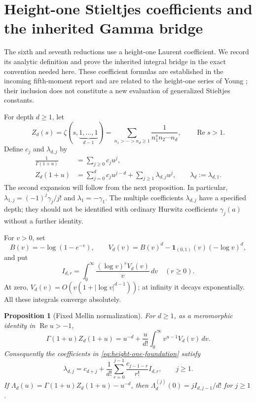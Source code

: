 \documentclass[11pt,a4paper]{article}
\numberwithin{equation}{section}
\theoremstyle{plain}
\newtheorem{proposition}[theorem]{Proposition}
\theoremstyle{definition}
\theoremstyle{remark}
\newcommand{\re}{\operatorname{Re}}
\begin{document}


\section{Height-one Stieltjes coefficients and the inherited Gamma bridge}
\label{sec:gamma-foundation}

The sixth and seventh reductions use a height-one Laurent coefficient.
We record its analytic definition and prove the inherited integral bridge
in the exact convention needed here. These coefficient formulas are
established in the incoming fifth-moment report and are related to the
height-one series of Young \cite{CanonicalFifth,Young2024}; their inclusion
does not constitute a new evaluation of generalized Stieltjes constants.

For depth $d\ge1$, let
\[
 Z_d(s)=\zeta(s,\underbrace{1,\ldots,1}_{d-1})
       =\sum_{n_1>\cdots>n_d\ge1}
          \frac{1}{n_1^s n_2\cdots n_d},\qquad \re s>1.
\]
Define $c_j$ and $\lambda_{d,j}$ by
\begin{align}
 \frac1{\Gamma(1+u)}&=\sum_{j\ge0}c_ju^j,\label{eq:gamma-c-foundation}\\
 Z_d(1+u)&=\sum_{j=0}^d c_ju^{j-d}
                    +\sum_{j\ge1}\lambda_{d,j}u^j,
 \qquad \lambda_d:=\lambda_{d,1}.
 \label{eq:height-one-foundation}
\end{align}
The second expansion will follow from the next proposition. In particular,
$\lambda_{1,j}=(-1)^j\gamma_j/j!$ and $\lambda_1=-\gamma_1$.
The multiple coefficients $\lambda_{d,j}$ have a specified depth; they
should not be identified with ordinary Hurwitz coefficients $\gamma_j(a)$
without a further identity.

For $v>0$, set
\[
 B(v)=-\log(1-e^{-v}),\qquad
 V_d(v)=B(v)^d-\boldsymbol1_{(0,1)}(v)(-\log v)^d,
\]
and put
\[
 I_{d,r}=\int_0^\infty\frac{(\log v)^rV_d(v)}v\,dv
 \quad(r\ge0).
\]
At zero, $V_d(v)=O(v(1+|\log v|^{d-1}))$; at infinity it
decays exponentially. All these integrals converge absolutely.

\begin{proposition}[Fixed Mellin normalization]
\label{prop:height-one-foundation}
For $d\ge1$, as a meromorphic identity in $\re u>-1$,
\begin{equation}\label{eq:height-one-Mellin-foundation}
 \Gamma(1+u)Z_d(1+u)
 =u^{-d}+\frac{u}{d!}
          \int_0^\infty v^{u-1}V_d(v)\,dv.
\end{equation}
Consequently the coefficients in \eqref{eq:height-one-foundation} satisfy
\begin{equation}\label{eq:height-one-allcoeff-foundation}
 \lambda_{d,j}=c_{d+j}
       +\frac1{d!}\sum_{r=0}^{j-1}
                     \frac{c_{j-1-r}}{r!}I_{d,r},\qquad j\ge1.
\end{equation}
If $\Lambda_d(u)=\Gamma(1+u)Z_d(1+u)-u^{-d}$, then
$\Lambda_d^{(j)}(0)=jI_{d,j-1}/d!$ for $j\ge1$.
\end{proposition}
\end{document}
